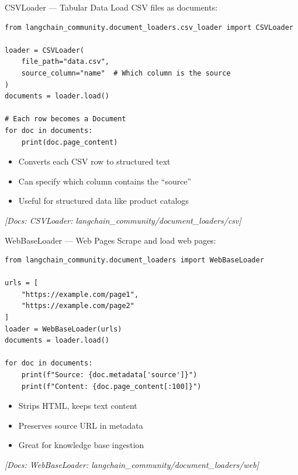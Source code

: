\documentclass[aspectratio=169,11pt]{beamer}
\newcommand{\docref}[1]{{\scriptsize\color{docgray}[Docs: #1]}}
\begin{document}
\begin{frame}[fragile]{CSVLoader --- Tabular Data}
  Load CSV files as documents:
  \begin{lstlisting}
from langchain_community.document_loaders.csv_loader import CSVLoader

loader = CSVLoader(
    file_path="data.csv",
    source_column="name"  # Which column is the source
)
documents = loader.load()

# Each row becomes a Document
for doc in documents:
    print(doc.page_content)
  \end{lstlisting}

  \vspace{0.5cm}
  \begin{itemize}
    \setlength{\itemsep}{1pt}
    \item Converts each CSV row to structured text
    \item Can specify which column contains the ``source''
    \item Useful for structured data like product catalogs
  \end{itemize}

  \textit{\docref{CSVLoader: langchain\_community/document\_loaders/csv}}
\end{frame}

\begin{frame}[fragile]{WebBaseLoader --- Web Pages}
  Scrape and load web pages:
  \begin{lstlisting}
from langchain_community.document_loaders import WebBaseLoader

urls = [
    "https://example.com/page1",
    "https://example.com/page2"
]
loader = WebBaseLoader(urls)
documents = loader.load()

for doc in documents:
    print(f"Source: {doc.metadata['source']}")
    print(f"Content: {doc.page_content[:100]}")
  \end{lstlisting}

  \vspace{0.5cm}
  \begin{itemize}
    \setlength{\itemsep}{1pt}
    \item Strips HTML, keeps text content
    \item Preserves source URL in metadata
    \item Great for knowledge base ingestion
  \end{itemize}

  \textit{\docref{WebBaseLoader: langchain\_community/document\_loaders/web}}
\end{frame}
\end{document}
